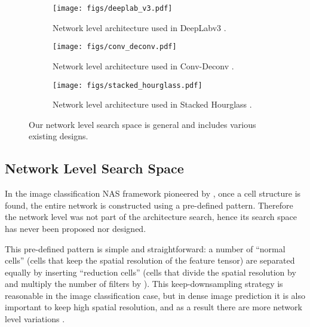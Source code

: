 \documentclass[10pt,twocolumn,letterpaper]{article}
\begin{document}
\begin{figure}[t]
    \centering
    \begin{subfigure}[t]{0.49\textwidth}
        \centering
        \texttt{[image: figs/deeplab\_v3.pdf]}
        \caption{Network level architecture used in DeepLabv3 \cite{chen2017rethinking}.}
\end{subfigure}
    \begin{subfigure}[t]{0.49\textwidth}
        \centering
        \texttt{[image: figs/conv\_deconv.pdf]}
        \caption{Network level architecture used in Conv-Deconv \cite{noh2015learning}.}
\end{subfigure}
    \begin{subfigure}[t]{0.49\textwidth}
        \centering
        \texttt{[image: figs/stacked\_hourglass.pdf]}
        \caption{Network level architecture used in Stacked Hourglass \cite{newell2016stacked}.}
\end{subfigure}
    \caption{Our network level search space is general and includes various existing designs.}
    \label{fig:popular_designs}
\end{figure}


\subsection{Network Level Search Space}
\label{sec:network_space}

In the image classification NAS framework pioneered by \cite{zoph2017learning}, once a cell structure is found, the entire network is constructed using a pre-defined pattern.
Therefore the network level was not part of the architecture search, hence its search space has never been proposed nor designed.

This pre-defined pattern is simple and straightforward: a number of ``normal cells'' (cells that keep the spatial resolution of the feature tensor) are separated equally by inserting ``reduction cells'' (cells that divide the spatial resolution by  and multiply the number of filters by ).
This keep-downsampling strategy is reasonable in the image classification case, 
but in dense image prediction it is also important to keep high spatial resolution, and as a result there are more network level variations \cite{chen2017rethinking, noh2015learning, newell2016stacked}.
\end{document}
